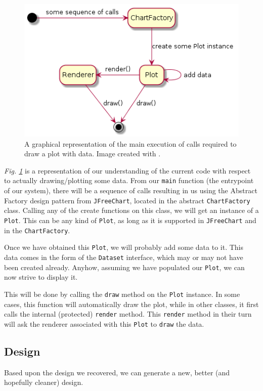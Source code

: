 \documentclass[11pt]{article}
\begin{document}
	\begin{figure}[H]
		\centering
		\includegraphics[scale=0.5]{pictures/draw-seq.png}
		\caption{A graphical representation of the main execution of calls required to draw a plot with data. Image created with \cite{plantuml}.}
		\label{fig:draw-seq}
	\end{figure}

	\textsl{Fig. \ref{fig:draw-seq}} is a representation of our understanding of the current code with respect to actually drawing/plotting some data. From our \texttt{main} function (the entrypoint of our system), there will be a sequence of calls resulting in us using the \textsf{Abstract Factory} design pattern from \texttt{JFreeChart}, located in the abstract \texttt{ChartFactory} class. Calling any of the create functions on this class, we will get an instance of a \texttt{Plot}. This can be any kind of \texttt{Plot}, as long as it is supported in \texttt{JFreeChart} and in the \texttt{ChartFactory}.
	
	Once we have obtained this \texttt{Plot}, we will probably add some data to it. This data comes in the form of the \texttt{Dataset} interface, which may or may not have been created already. Anyhow, assuming we have populated our \texttt{Plot}, we can now strive to display it.
	
	This will be done by calling the \texttt{draw} method on the \texttt{Plot} instance. In some cases, this function will automatically draw the plot, while in other classes, it first calls the internal (protected) \texttt{render} method. This \texttt{render} method in their turn will ask the renderer associated with this \texttt{Plot} to \texttt{draw} the data.

	\subsection{Design}
	\label{sec:design}
	Based upon the design we recovered, we can generate a new, better (and hopefully cleaner) design.
	
\end{document}
